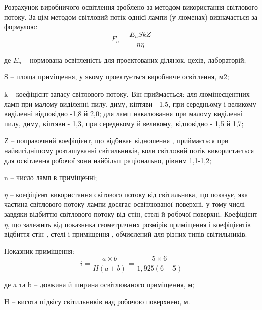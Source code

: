 Розрахунок виробничого освітлення зроблено за методом використання 
світлового потоку. За цім методом світловий потік однієї лампи (у люменах) визначається за формулою:
\begin{equation}
\label{eq:fnop}
 F_n = \frac{E_{n}SkZ}{n \eta}
\end{equation}
\begin{ESKDexplanation}
\item де $E_n$ -- нормована освітленість для проектованих ділянок, цехів, лабораторій;
\item S – площа приміщення, у якому проектується виробниче освітлення, м2;
\item k – коефіцієнт запасу світлового потоку. Він приймається: для люмінесцентних ламп при малому виділенні пилу, диму, кіптяви - 1,5, при середньому і великому виділенні відповідно -1,8 й 2,0; для ламп накалювання при малому виділенні пилу, диму, кіптяви - 1,3, при середньому й великому, відповідно - 1,5 й 1,7;
\item Z – поправочний коефіцієнт, що відбиває відношення  , приймається при найвигіднішому розташуванні світильників, коли світловий потік використається для освітлення робочої зони найбільш раціонально, рівним 1,1-1,2; 
\item n – число ламп в приміщенні;
\item  $\eta$ – коефіцієнт використання світового потоку від світильника, що показує, яка частина світлового потоку лампи   досягає освітлюваної поверхні, у тому числі завдяки відбиттю світлового потоку від стін, стелі й робочої поверхні.
Коефіцієнт $\eta$, що залежить від показника геометричних розмірів приміщення   і коефіцієнтів відбиття стін  , стелі   і приміщення  , обчислений для різних типів світильників.	  
\end{ESKDexplanation}

Показник  приміщення:
\begin{equation}
\label{eq:iop}
 i = \frac{a \times b}{H(a+b)}= \frac{5 \times 6}{1,925(6+5)}
\end{equation}
\begin{ESKDexplanation}
  \item де a та b – довжина й ширина освітлюваного приміщення, м;  
  \item H – висота підвісу світильників над робочою поверхнею, м.
\end{ESKDexplanation}

